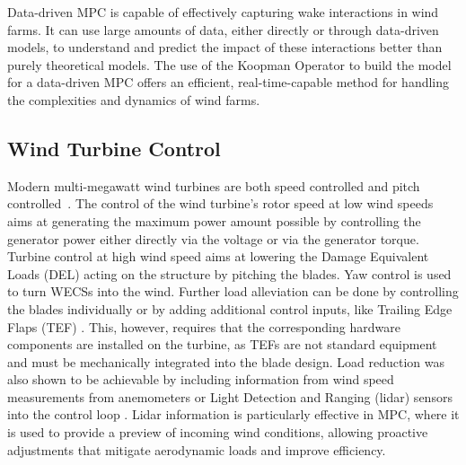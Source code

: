Data-driven MPC is capable of effectively capturing wake interactions in wind farms. It can use large amounts of data, either directly or through data-driven models, to understand and predict the impact of these interactions better than purely theoretical models. The use of the Koopman Operator \cite{koopman1931hamiltonian} to build the model for a data-driven MPC offers an efficient, real-time-capable method for handling the complexities and dynamics of wind farms.

\subsection{Wind Turbine Control} 
Modern multi-megawatt wind turbines are both speed controlled and pitch control\-led~\cite{wright2008advanced}. The control of the wind turbine's rotor speed at low wind speeds aims at generating the maximum power amount possible by controlling the generator power either directly via the voltage or via the generator torque. Turbine control at high wind speed aims at lowering the Damage Equivalent Loads (DEL) acting on the structure by pitching the blades. Yaw control is used to turn WECSs into the wind. Further load alleviation can be done by controlling the blades individually or by adding additional control inputs, like Trailing Edge Flaps (TEF) \cite{zhang2015parameter}. This, however, requires that the corresponding hardware components are installed on the turbine, as TEFs are not standard equipment and must be mechanically integrated into the blade design. Load reduction was also shown to be achievable by including information from wind speed measurements from anemometers or Light Detection and Ranging (lidar) sensors into the control loop \cite{schlipf2013nonlinear}. Lidar information is particularly effective in MPC, where it is used to provide a preview of incoming wind conditions, allowing proactive adjustments that mitigate aerodynamic loads and improve efficiency.

